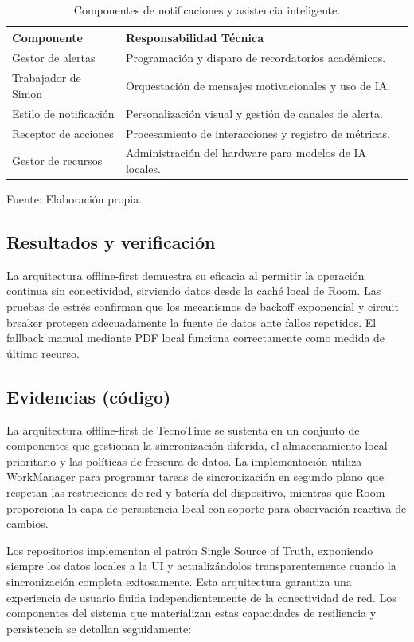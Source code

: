 \begin{table}[H]
\centering
\renewcommand{\arraystretch}{1.2}
\begin{tabularx}{\linewidth}{@{}>{\RaggedRight\arraybackslash}p{3.5cm}X@{}}
\toprule
Componente & Responsabilidad Técnica \\
\midrule
Gestor de alertas & Programación y disparo de recordatorios académicos. \\
Trabajador de Simon & Orquestación de mensajes motivacionales y uso de IA. \\
Estilo de notificación & Personalización visual y gestión de canales de alerta. \\
Receptor de acciones & Procesamiento de interacciones y registro de métricas. \\
Gestor de recursos & Administración del hardware para modelos de IA locales. \\
\bottomrule
\end{tabularx}
\caption{Componentes de notificaciones y asistencia inteligente.}\label{tab:f4_notificaciones_ia}
Fuente: Elaboración propia.
\end{table}

\subsection{Resultados y verificación}
La arquitectura offline-first demuestra su eficacia al permitir la operación continua sin conectividad, sirviendo datos desde la caché local de Room. Las pruebas de estrés confirman que los mecanismos de backoff exponencial y circuit breaker protegen adecuadamente la fuente de datos ante fallos repetidos. El fallback manual mediante PDF local funciona correctamente como medida de último recurso.

\subsection{Evidencias (código)}
La arquitectura offline-first de TecnoTime se sustenta en un conjunto de componentes que gestionan la sincronización diferida, el almacenamiento local prioritario y las políticas de frescura de datos. La implementación utiliza WorkManager para programar tareas de sincronización en segundo plano que respetan las restricciones de red y batería del dispositivo, mientras que Room proporciona la capa de persistencia local con soporte para observación reactiva de cambios.

Los repositorios implementan el patrón Single Source of Truth, exponiendo siempre los datos locales a la UI y actualizándolos transparentemente cuando la sincronización completa exitosamente. Esta arquitectura garantiza una experiencia de usuario fluida independientemente de la conectividad de red. Los componentes del sistema que materializan estas capacidades de resiliencia y persistencia se detallan seguidamente:

